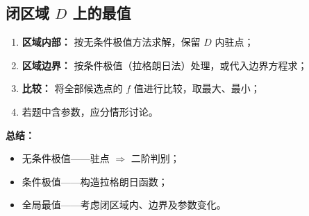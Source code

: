 \subsection{闭区域 $D$ 上的最值}

\begin{enumerate}
    \item \textbf{区域内部：} 按无条件极值方法求解，保留 $D$ 内驻点；
    \item \textbf{区域边界：} 按条件极值（拉格朗日法）处理，或代入边界方程求；
    \item \textbf{比较：} 将全部候选点的 $f$ 值进行比较，取最大、最小；
    \item 若题中含参数，应分情形讨论。
\end{enumerate}


\textbf{总结：}
\begin{itemize}
    \item 无条件极值——驻点 $\Rightarrow$ 二阶判别；
    \item 条件极值——构造拉格朗日函数；
    \item 全局最值——考虑闭区域内、边界及参数变化。
\end{itemize}
